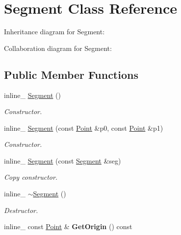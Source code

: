 \hypertarget{class_segment}{\section{Segment Class Reference}
\label{class_segment}
}


Inheritance diagram for Segment\+:


Collaboration diagram for Segment\+:
\subsection*{Public Member Functions}
\begin{DoxyCompactItemize}
\item 
\hypertarget{class_segment_ab067e08f6599ee1806e1d194e4a7a4e9}{inline\+\_\+ \hyperlink{class_segment_ab067e08f6599ee1806e1d194e4a7a4e9}{Segment} ()}\label{class_segment_ab067e08f6599ee1806e1d194e4a7a4e9}

\begin{DoxyCompactList}\small\item\em Constructor. \end{DoxyCompactList}\item 
\hypertarget{class_segment_a02406c475aa9c46fa205290109a762a1}{inline\+\_\+ \hyperlink{class_segment_a02406c475aa9c46fa205290109a762a1}{Segment} (const \hyperlink{class_point}{Point} \&p0, const \hyperlink{class_point}{Point} \&p1)}\label{class_segment_a02406c475aa9c46fa205290109a762a1}

\begin{DoxyCompactList}\small\item\em Constructor. \end{DoxyCompactList}\item 
\hypertarget{class_segment_a576715f83bfd385c7e71222fe3e77019}{inline\+\_\+ \hyperlink{class_segment_a576715f83bfd385c7e71222fe3e77019}{Segment} (const \hyperlink{class_segment}{Segment} \&seg)}\label{class_segment_a576715f83bfd385c7e71222fe3e77019}

\begin{DoxyCompactList}\small\item\em Copy constructor. \end{DoxyCompactList}\item 
\hypertarget{class_segment_ab64b9646af8a507fb06a1e838e236327}{inline\+\_\+ \hyperlink{class_segment_ab64b9646af8a507fb06a1e838e236327}{$\sim$\+Segment} ()}\label{class_segment_ab64b9646af8a507fb06a1e838e236327}

\begin{DoxyCompactList}\small\item\em Destructor. \end{DoxyCompactList}\item 
\hypertarget{class_segment_a032468942d1ec87f4b63e21015917890}{inline\+\_\+ const \hyperlink{class_point}{Point} \& {\bfseries Get\+Origin} () const }\label{class_segment_a032468942d1ec87f4b63e21015917890}


\end{DoxyCompactItemize}
